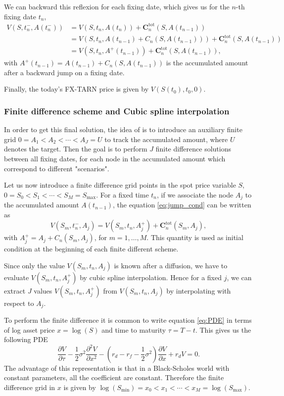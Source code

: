 We can backward this reflexion for each fixing date, which gives us for the $n$-th fixing date $t_n$,
\begin{align}\label{eq:jump_cond}
V(S,t_n^-,A(t_n^-)) &= V(S,t_n,A(t_n))+\mathbf{C}^\text{tot}_n(S,A(t_{n-1}))\nonumber\\
&=V(S,t_n,A(t_{n-1})+C_n(S,A(t_{n-1})))+\mathbf{C}^\text{tot}_n(S,A(t_{n-1}))\nonumber\\
&=V(S,t_n,A^+(t_{n-1}))+\mathbf{C}^\text{tot}_n(S,A(t_{n-1})),
\end{align}
with $A^+(t_{n-1})=A(t_{n-1})+C_n(S,A(t_{n-1}))$ is the accumulated amount after a backward jump on a fixing date.

Finally, the today's FX-TARN price is given by $V(S(t_0),t_0,0)$.

\subsubsection{Finite difference scheme and Cubic spline interpolation}
In order to get this final solution, the idea of \citeauthor{LS15} is to introduce an auxiliary finite grid $0 = A_1<A_2<\cdots<A_J= U$ to track the accumulated amount, where $U$ denotes the target. Then the goal is to perform $J$ finite difference solutions between all fixing dates, for each node in the accumulated amount which correspond to different "scenarios". 

Let us now introduce a finite difference grid points in the spot price variable $S$, $0 = S_0 < S_1 <\cdots<S_M = S_{\max}$. For a fixed time $t_n$, if we associate the node $A_j$ to the accumulated amount $A(t_{n-1})$, the equation \eqref{eq:jump_cond} can be written as
$$V(S_m,t^-_n,A_j) = V(S_m,t_n,A^+_j)+ \mathbf{C}^\text{tot}_n(S_m,A_j),$$
with $A_j^+ = A_j + C_n(S_m,A_j)$, for $m=1,\ldots,M$. This quantity is used as initial condition at the beginning of each finite different scheme.

Since only the value $V(S_m,t_n,A_j)$ is known after a diffusion, we have to evaluate $V(S_m,t_n,A_j^+)$ by cubic spline interpolation. Hence for a fixed $j$, we can extract $J$ values $V(S_m,t_n,A_j^+)$ from $V(S_m,t_n,A_j)$ by interpolating with respect to $A_j$.

To perform the finite difference it is common to write equation \eqref{eq:PDE} in terms of log asset price $x = \log(S)$ and time to maturity $\tau=T-t$. This gives us the following PDE
$$\frac{\partial V}{\partial \tau}-\frac{1}{2}\sigma^2\frac{\partial^2 V}{\partial x^2}-\left(r_d - r_f - \frac{1}{2}\sigma^2\right)\frac{\partial V}{\partial x}+r_d V = 0.$$
The advantage of this representation is that in a Black-Scholes world with constant parameters, all the coefficient are constant. Therefore the finite difference grid in $x$ is given by $\log(S_{\min}) = x_0 < x_1<\cdots<x_M = \log(S_{\max})$. 

